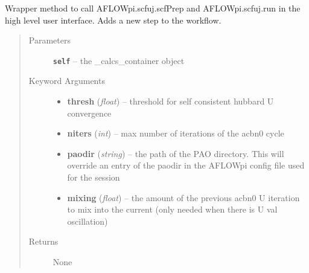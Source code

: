 \documentclass[letterpaper,10pt,english]{sphinxmanual}
\begin{document}
\begin{fulllineitems}

\begin{fulllineitems}
\label{prep:prep.calcs_container.scf}
\end{fulllineitems}


\begin{fulllineitems}
\label{prep:prep.calcs_container.scfuj}
Wrapper method to call AFLOWpi.scfuj.scfPrep and AFLOWpi.scfuj.run in the high level
user interface. Adds a new step to the workflow.
\begin{quote}\begin{description}
\item[{Parameters}] \leavevmode
\textbf{\texttt{self}} -- the \_calcs\_container object

\item[{Keyword Arguments}] \leavevmode\begin{itemize}
\item {} 
\textbf{thresh} (\emph{float}) --
threshold for self consistent hubbard U convergence

\item {} 
\textbf{niters} (\emph{int}) --
max number of iterations of the acbn0 cycle

\item {} 
\textbf{paodir} (\emph{string}) --
the path of the PAO directory. This will override
an entry of the paodir in the AFLOWpi config file
used for the session

\item {} 
\textbf{mixing} (\emph{float}) --
the amount of the previous acbn0 U iteration to mix into
the current (only needed when there is U val oscillation)

\end{itemize}

\item[{Returns}] \leavevmode
None

\end{description}\end{quote}

\end{fulllineitems}



\end{fulllineitems}
\end{document}
